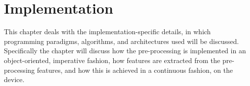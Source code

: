 \chapter{Implementation}
This chapter deals with the implementation-specific details, in which programming paradigms, algorithms, and architectures used will be discussed. Specifically the chapter will discuss how the pre-processing is implemented in an object-oriented, imperative fashion, how features are extracted from the pre-processing features, and how this is achieved in a continuous fashion, on the device.







